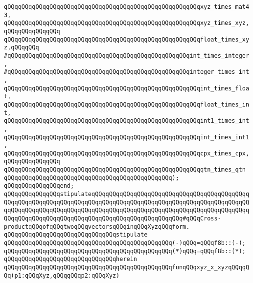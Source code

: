 \verb|qQQqqQQqqQQqqQQqqQQqqQQqqQQqqQQqqQQqqQQqqQQqqQQqqQQqqQQqxyz_times_mat43,|\newline
\verb|qQQqqQQqqQQqqQQqqQQqqQQqqQQqqQQqqQQqqQQqqQQqqQQqqQQqqQQqxyz_times_xyz,qQQqqQQqqQQqqQQq|\newline
\verb|qQQqqQQqqQQqqQQqqQQqqQQqqQQqqQQqqQQqqQQqqQQqqQQqqQQqqQQqfloat_times_xyz,qQQqqQQq|\newline
\verb|#qQQqqQQqqQQqqQQqqQQqqQQqqQQqqQQqqQQqqQQqqQQqqQQqqQQqint_times_integer,|\newline
\verb|#qQQqqQQqqQQqqQQqqQQqqQQqqQQqqQQqqQQqqQQqqQQqqQQqqQQqinteger_times_int,|\newline
\verb|qQQqqQQqqQQqqQQqqQQqqQQqqQQqqQQqqQQqqQQqqQQqqQQqqQQqqQQqint_times_float,|\newline
\verb|qQQqqQQqqQQqqQQqqQQqqQQqqQQqqQQqqQQqqQQqqQQqqQQqqQQqqQQqfloat_times_int,|\newline
\verb|qQQqqQQqqQQqqQQqqQQqqQQqqQQqqQQqqQQqqQQqqQQqqQQqqQQqqQQqint1_times_int,|\newline
\verb|qQQqqQQqqQQqqQQqqQQqqQQqqQQqqQQqqQQqqQQqqQQqqQQqqQQqqQQqint_times_int1,|\newline
\verb|qQQqqQQqqQQqqQQqqQQqqQQqqQQqqQQqqQQqqQQqqQQqqQQqqQQqqQQqcpx_times_cpx,qQQqqQQqqQQqqQQq|\newline
\verb|qQQqqQQqqQQqqQQqqQQqqQQqqQQqqQQqqQQqqQQqqQQqqQQqqQQqqQQqqtn_times_qtn|\newline
\verb|qQQqqQQqqQQqqQQqqQQqqQQqqQQqqQQqqQQqqQQqqQQqqQQq);|\newline
\verb|qQQqqQQqqQQqqQQqend;|\newline
\newline
\verb|qQQqqQQqqQQqqQQqstipulateqQQqqQQqqQQqqQQqqQQqqQQqqQQqqQQqqQQqqQQqqQQqqQQqqQQqqQQqqQQqqQQqqQQqqQQqqQQqqQQqqQQqqQQqqQQqqQQqqQQqqQQqqQQqqQQqqQQqqQQqqQQqqQQqqQQqqQQqqQQqqQQqqQQqqQQqqQQqqQQqqQQqqQQqqQQqqQQqqQQqqQQqqQQqqQQqqQQqqQQqqQQqqQQqqQQqqQQqqQQqqQQqqQQqqQQqqQQq#qQQqCross-productqQQqofqQQqtwoqQQqvectorsqQQqinqQQqXyzqQQqform.|\newline
\verb|qQQqqQQqqQQqqQQqqQQqqQQqqQQqqQQqstipulate|\newline
\verb|qQQqqQQqqQQqqQQqqQQqqQQqqQQqqQQqqQQqqQQqqQQqqQQq(-)qQQq=qQQqf8b::(-);|\newline
\verb|qQQqqQQqqQQqqQQqqQQqqQQqqQQqqQQqqQQqqQQqqQQqqQQq(*)qQQq=qQQqf8b::(*);|\newline
\verb|qQQqqQQqqQQqqQQqqQQqqQQqqQQqqQQqherein|\newline
\verb|qQQqqQQqqQQqqQQqqQQqqQQqqQQqqQQqqQQqqQQqqQQqqQQqfunqQQqxyz_x_xyzqQQqqQQq(p1:qQQqXyz,qQQqqQQqp2:qQQqXyz)|\newline
